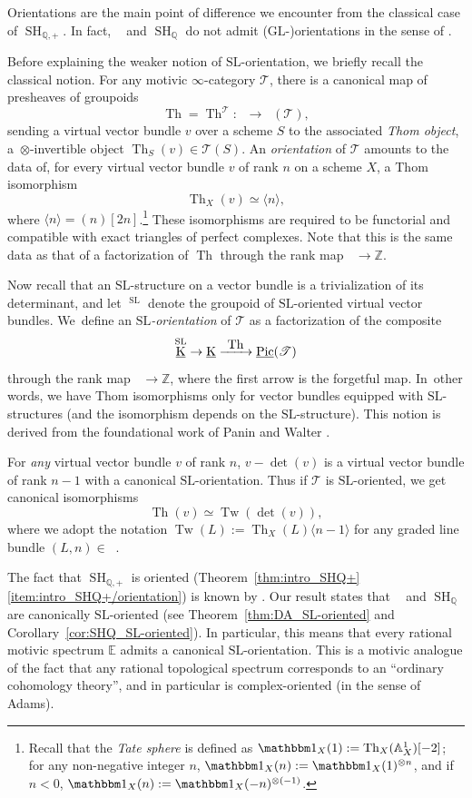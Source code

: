 \documentclass[JEP,XML,SOM,Unicode]{cedram}
\def\To#1{\mathchoice{\xrightarrow{\textstyle\kern4pt#1\kern3pt}}{\stackrel{#1}{\longrightarrow}}{}{}}
\newcommand{\T}{\mathscr T}
\DeclareMathOperator{\uK}{\underline K}
\DeclareMathOperator{\uPic}{\underline{Pic}}
\renewcommand{\AA}{\mathbb A}
\newcommand{\E}{\mathbb E}
\newcommand{\un}{\mathbbm 1}
\newcommand{\GL}{\mathrm{GL}}
\newcommand{\SL}{\mathrm{SL}}
\DeclareMathOperator{\SH}{SH}
\DeclareMathOperator{\DAminus}{D_{\AA^1,-}}
\newcommand{\twist}[1]{\langle #1 \rangle}
\DeclareMathOperator{\Th}{Th}
\DeclareMathOperator{\Tw}{Tw}
\newcommand{\ZZ} {\mathbb Z}
\newcommand{\QQ} {\mathbb Q}
\theoremstyle{remark}
\theoremstyle{definition}
\numberwithin{equation}{thm}
\begin{document}
Orientations are the main point of difference we encounter from the classical case of $\SH_{\QQ,+}$.
In fact, $\DAminus$ and $\SH_\QQ$ do not admit ($\GL$-)orientations in the sense of \cite[Def.\,2.4.38]{CD3}.

Before explaining the weaker notion of $\SL$-orientation, we briefly recall the classical notion.
For any motivic $\infty$-category $\T$, there is a canonical map of presheaves of groupoids
\[
\Th = \Th^\T : \uK \to \uPic(\T),
\]
sending a virtual vector bundle $v$ over a scheme $S$ to the associated \emph{Thom object}, a~$\otimes$-invertible object $\Th_S(v) \in \T(S)$.
An \emph{orientation} of $\T$ amounts to the data of, for every virtual vector bundle $v$ of rank $n$ on a scheme $X$, a Thom isomorphism
\[
\Th_X(v) \simeq \twist{n},
\]
where $\twist{n} = (n)[2n]$.\footnote{Recall that the \emph{Tate sphere} is defined as $\un_X(1):=\Th_X(\mathbb{A}^1_X)[-2]$; for any non-negative integer $n$, $\un_X(n):=\un_X(1)^{\otimes n}$, and if $n<0$, $\un_X(n):=\un_X(-n)^{\otimes (-1)}$.}
These isomorphisms are required to be functorial and compatible with exact triangles of perfect complexes.
Note that this is the same data as that of a factorization of $\Th$ through the rank map $\uK \to \ZZ$.

Now recall that an $\SL$-structure on a vector bundle is a trivialization of its deter\-mi\-nant, and let $\uK^\SL$ denote the groupoid of $\SL$-oriented virtual vector bundles.
We~define an \emph{$\SL$-orientation} of $\T$ as a factorization of the composite
\[
\uK^\SL \to \uK \To{\Th} \uPic(\T)
\]
through the rank map $\uK \to \ZZ$, where the first arrow is the forgetful map.
In~other words, we have Thom isomorphisms only for vector bundles equipped with $\SL$\nobreakdash-structures (and the isomorphism depends on the $\SL$-structure).
This notion is derived from the foundational work of Panin and Walter \cite{PaninWalter1}.

For \emph{any} virtual vector bundle $v$ of rank $n$, $v - \det(v)$ is a virtual vector bundle of rank $n-1$ with a canonical $\SL$-orientation.
Thus if $\T$ is $\SL$-oriented, we get canonical isomorphisms
\[
\Th(v) \simeq \Tw(\det(v)),
\]
where we adopt the notation $\Tw(L) := \Th_X(L)\twist{n-1}$ for any graded line bundle $(L, n) \in \uPic$.

The fact that $\SH_{\QQ,+}$ is oriented (Theorem~\ref{thm:intro_SHQ+}\eqref{item:intro_SHQ+/orientation}) is known by \cite[14.2.5 \& Th.\,16.2.13]{CD3}.
Our result states that $\DAminus$ and $\SH_\QQ$ are canonically $\SL$-oriented (see Theorem~\ref{thm:DA_SL-oriented} and Corollary~\ref{cor:SHQ_SL-oriented}).
In particular, this means that every rational motivic spectrum $\E$ admits a canonical $\SL$-orientation.
This is a motivic analogue of the fact that any rational topological spectrum corresponds to an ``ordinary cohomology theory'', and in particular is complex-oriented (in the sense of Adams).
\end{document}
